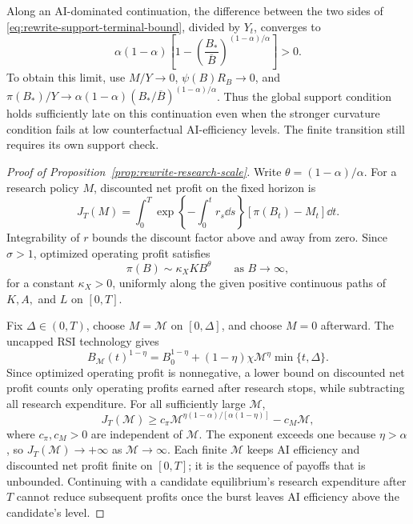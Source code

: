 Along an AI-dominated continuation, the difference between the two sides of
\eqref{eq:rewrite-support-terminal-bound}, divided by $Y_t$, converges to
\[
 \alpha(1-\alpha)
 \left[1-\left(\frac{B_*}{\overline B}\right)^{(1-\alpha)/\alpha}\right]>0.
\]
To obtain this limit, use $M/Y\to0$, $\psi(B)R_B\to0$, and
$\pi(B_*)/Y\to\alpha(1-\alpha)(B_*/\overline B)^{(1-\alpha)/\alpha}$.
Thus the global support condition holds sufficiently late on this
continuation even when the stronger curvature condition fails at low
counterfactual AI-efficiency levels. The finite transition still requires its own
support check.





\begin{proof}[Proof of Proposition~\ref{prop:rewrite-research-scale}]
\label{proof:rewrite-research-scale}
Write $\theta=(1-\alpha)/\alpha$. For a research policy $M$, discounted
net profit on the fixed horizon is
\[
 J_T(M)=\int_0^T
 \exp\left\{-\int_0^t r_s\dd s\right\}
 [\pi(B_t)-M_t]\dd t.
\]
Integrability of $r$ bounds the discount factor above and away from zero.
Since $\sigma>1$, optimized operating profit satisfies
\[
 \pi(B)\sim\kappa_XKB^\theta
 \qquad\text{as }B\to\infty,
\]
for a constant $\kappa_X>0$, uniformly along the given positive continuous
paths of $K,A,$ and $L$ on $[0,T]$.

Fix $\Delta\in(0,T)$, choose $M=\mathcal M$ on $[0,\Delta]$, and choose
$M=0$ afterward. The uncapped RSI technology gives
\[
 B_{\mathcal M}(t)^{1-\eta}=B_0^{1-\eta}
 +(1-\eta)\chi\mathcal M^\eta\min\{t,\Delta\}.
\]
Since optimized operating profit is nonnegative, a lower bound on discounted
net profit counts only operating profits earned after research stops, while
subtracting all research expenditure. For all sufficiently large $\mathcal M$,
\begin{equation}
 J_T(\mathcal M)\geq c_\pi\mathcal M^{
 \eta(1-\alpha)/[\alpha(1-\eta)]}
 -c_M\mathcal M,
 \label{eq:rewrite-research-burst-payoff}
\end{equation}
where $c_\pi,c_M>0$ are independent of $\mathcal M$.
The exponent exceeds one because $\eta>\alpha$,
so $J_T(\mathcal M)\to+\infty$ as $\mathcal M\to\infty$.
Each finite $\mathcal M$ keeps AI efficiency and discounted net profit
finite on $[0,T]$; it is the sequence of payoffs that is unbounded.
Continuing with a candidate equilibrium's research expenditure after $T$
cannot reduce subsequent profits once the burst leaves AI efficiency above
the candidate's level.
\end{proof}

